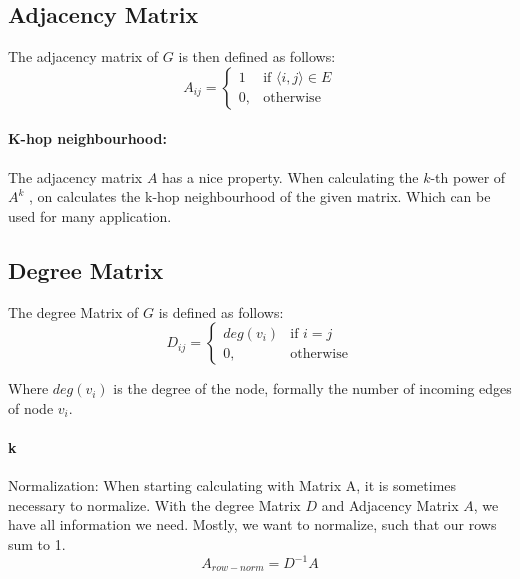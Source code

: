 \subsection{Adjacency Matrix}
The adjacency matrix of $G$ is then defined as follows:
\begin{equation}
    \label{eg:AdjacencyMatrix}
    A_{ij} =    
    \begin{cases}
        1  & \text{if } \langle i , j \rangle \in E \\
        0, & \text{otherwise}
    \end{cases}
\end{equation}

\paragraph{K-hop neighbourhood:}
The adjacency matrix $A$ has a nice property. When calculating the $k$-th power of $A^k$ , on calculates the k-hop neighbourhood
of the given matrix. Which can be used for many application.

\subsection{Degree Matrix}
The degree Matrix of $G$ is defined as follows:
\begin{equation}
    D_{ij} =    
    \begin{cases}
        deg(v_i)  & \text{if } i = j \\
        0, & \text{otherwise}
    \end{cases}
\end{equation}

Where $deg(v_i)$ is the degree of the node, formally the number of incoming edges of node $v_i$.

\paragraph{k}{Normalization:}
When starting calculating with Matrix A, it is sometimes necessary to normalize.
With the degree Matrix $D$ and Adjacency Matrix $A$, we have all information we need.
Mostly, we want to normalize, such that our rows sum to 1.
\begin{equation}
    A_{row-norm} = D^{-1} A
\end{equation}

